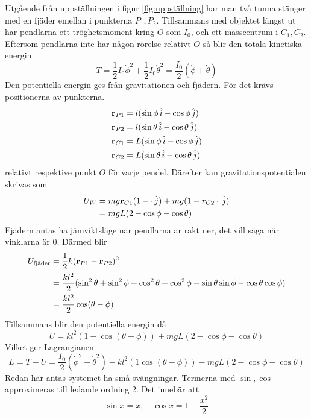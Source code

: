 Utgående från uppställningen i figur \ref{fig:uppställning} har man två tunna stänger med en fjäder emellan i punkterna $P_1,P_2$. Tillsammans med objektet längst ut har pendlarna ett tröghetsmoment kring $O$ som $I_0$, och ett masscentrum i $C_1,C_2$. Eftersom pendlarna inte har någon rörelse relativt $O$ så blir den totala kinetiska energin \begin{equation}
    T = \frac{1}{2}I_0 \dot{\phi}^2 + \frac{1}{2}I_0 \dot{\theta}^2 = \frac{I_0}{2}(\dot{\phi}+\dot{\theta})
\end{equation}
Den potentiella energin ges från gravitationen och fjädern. För det krävs positionerna av punkterna.
\begin{align}
    \vb r_{P1} &= l (\sin\phi\, \hat{i}-\cos\phi\, \hat{j})\\
    \vb r_{P2} &= l (\sin\theta\, \hat{i}-\cos\theta\, \hat{j})\\
    \vb r_{C1} &= L (\sin\phi\, \hat{i}-\cos\phi\, \hat{j})\\
    \vb r_{C2} &= L (\sin\theta\, \hat{i}-\cos\theta\, \hat{j})\\
\end{align}
relativt respektive punkt $O$ för varje pendel. Därefter kan gravitationspotentialen skrivas som \begin{align}
    U_W &= mg \vb r_{C1}(1-\cdot \, \hat{j}) + mg \vb(1- r_{C2}\cdot \, \hat{j})\\
    &=mgL(2-\cos\phi-\cos\theta)
\end{align}
Fjädern antas ha jämviktsläge när pendlarna är rakt ner, det vill säga när vinklarna är 0. Därmed blir \begin{align}
    U_{\textrm{fjäder}} &= \frac{1}{2}k(\vb r_{P1}-\vb r_{P2})^2 \\ &= \frac{kl^2}{2}(\sin^2\theta+\sin^2\phi+\cos^2\theta+\cos^2\phi-\sin\theta\sin\phi-\cos\theta\cos\phi)\\
    &=\frac{kl^2}{2}\cos(\theta-\phi)
\end{align}
Tillsammans blir den potentiella energin då \begin{equation}
    U = kl^2(1-\cos(\theta-\phi)) + mgL(2-\cos\phi-\cos\theta)
\end{equation}
Vilket ger Lagrangianen \cite{nordling_physics_2021} \begin{equation}
    L = T-U = \frac{I_0}{2}(\dot{\phi}^2+\dot{\theta}^2) - kl^2(1\cos(\theta-\phi)) -mgL(2-\cos\phi-\cos\theta)
\end{equation}
Redan här antas systemet ha små svängningar. Termerna med $\sin,\cos$ approximeras till ledande ordning 2. Det innebär att \begin{equation}
    \sin x = x,\quad \cos x = 1-\frac{x^2}{2}
\end{equation}
